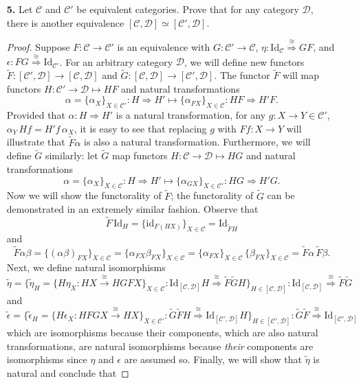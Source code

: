 \documentclass[ 12pt ]{article}
\begin{document}
\begin{enumerate}
	\item[\textbf{5.}] Let $\mathscr{C}$ and $\mathscr{C}'$ be equivalent categories. Prove that for any category $\mathscr{D}$, there is another equivalence $[\mathscr{C}, \mathscr{D}] \simeq [\mathscr{C}', \mathscr{D}]$.

		\begin{proof}
			Suppose $F : \mathscr{C} \to \mathscr{C}'$ is an equivalence with $G : \mathscr{C}' \to \mathscr{C}$, $\eta : \mathrm{Id}_\mathscr{C} \overset{\cong}{\Rightarrow} GF$, and $\epsilon : FG \overset{\cong}{\Rightarrow} \mathrm{Id}_{\mathscr{C}'}$. For an arbitrary category $\mathscr{D}$, we will define new functors $\widetilde{F} : [\mathscr{C}', \mathscr{D}] \to [\mathscr{C}, \mathscr{D}]$ and $\widetilde{G} : [\mathscr{C}, \mathscr{D}] \to [\mathscr{C}', \mathscr{D}]$. The functor $\widetilde{F}$ will map functors $H : \mathscr{C}' \to \mathscr{D} \longmapsto HF$ and natural transformations $$\alpha = \{ \alpha_X \}_{X \in \mathscr{C}'} : H \Rightarrow H' \longmapsto \{ \alpha_{FX} \}_{X \in \mathscr{C}} : HF \Rightarrow H'F.$$ Provided that $\alpha : H \Rightarrow H'$ is a natural transformation, for any $g : X \to Y \in \mathscr{C}'$, $\alpha_Y\, Hf = H' f\, \alpha_X$, it is easy to see that replacing $g$ with $Ff : X \to Y$ will illustrate that $\widetilde{F} \alpha$ is also a natural transformation. Furthermore, we will define $\widetilde{G}$ similarly: let $\widetilde{G}$ map functors $H : \mathscr{C} \to \mathscr{D} \longmapsto HG$ and natural transformations $$\alpha = \{ \alpha_X \}_{X \in \mathscr{C}} : H \Rightarrow H' \longmapsto \{ \alpha_{GX} \}_{X \in \mathscr{C}'} : HG \Rightarrow H'G.$$ Now we will show the functorality of $\widetilde{F}$; the functorality of $\widetilde{G}$ can be demonstrated in an extremely similar fashion. Observe that $$\widetilde{F}\, \mathrm{Id}_H = \{ \mathrm{id}_{F(HX)} \}_{X \in \mathscr{C}} = \mathrm{Id}_{\widetilde{F}H}$$ and $$\widetilde{F} \alpha \beta = \{ (\alpha \beta)_{FX} \}_{X \in \mathscr{C}} = \{ \alpha_{FX} \beta_{FX} \}_{X \in \mathscr{C}} = \{ \alpha_{FX} \}_{X \in \mathscr{C}}\, \{ \beta_{FX} \}_{X \in \mathscr{C}} = \widetilde{F} \alpha\, \widetilde{F} \beta.$$ Next, we define natural isomorphisms $$\widetilde{\eta} = \{ \widetilde{\eta}_H = \{ H \eta_X : HX \overset{\cong}{\to} HGFX \}_{X \in \mathscr{C}} : \mathrm{Id}_{[\mathscr{C}, \mathscr{D}]} H \overset{\cong}{\Rightarrow} \widetilde{F} \widetilde{G} H \}_{H \in [\mathscr{C}, \mathscr{D}]} : \mathrm{Id}_{[\mathscr{C}, \mathscr{D}]} \overset{\cong}{\Rightarrow} \widetilde{F} \widetilde{G}$$ and $$\widetilde{\epsilon} = \{ \widetilde{\epsilon}_H = \{ H \epsilon_X : HFGX \overset{\cong}{\to} HX \}_{X \in \mathscr{C}'} : \widetilde{G} \widetilde{F} H \overset{\cong}{\Rightarrow} \mathrm{Id}_{[\mathscr{C}', \mathscr{D}]} H \}_{H \in [\mathscr{C}', \mathscr{D}]} : \widetilde{G} \widetilde{F} \overset{\cong}{\Rightarrow} \mathrm{Id}_{[\mathscr{C}', \mathscr{D}]}$$ which are isomorphisms because their components, which are also natural transformations, are natural isomorphisms because \textit{their} components are isomorphisms since $\eta$ and $\epsilon$ are assumed so. Finally, we will show that $\widetilde{\eta}$ is natural and conclude that 
\end{proof}
\end{enumerate}
\end{document}
